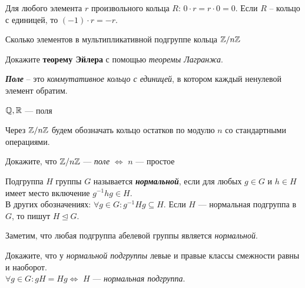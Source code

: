 \documentclass{article}
\begin{document}
    \begin{task_boxed}
        Для любого элемента $r$ произвольного кольца $R$: $0 \cdot r = r \cdot 0 = 0$.
        Если $R$ – кольцо с единицей, то $(-1) \cdot r = -r$.
    \end{task_boxed}

    \begin{task_boxed}
        Сколько элементов в мультипликативной подгруппе кольца $\mathbb{Z}/n\mathbb{Z}$
    \end{task_boxed}


    \begin{task_boxed}
        Докажите \textbf{теорему Эйлера} с помощью \textit{теоремы Лагранжа}.
    \end{task_boxed}


    \begin{definition_boxed}
        \textbf{\textit{Поле}} – это\textit{ коммутативное кольцо с единицей}, в котором каждый ненулевой элемент обратим.
    \end{definition_boxed}

    \begin{example}
        $ \mathbb{Q}, \mathbb{R} $ --- поля
    \end{example}


    \begin{example}
        Через $\mathbb{Z}/n\mathbb{Z}$ будем обозначать кольцо остатков по модулю $n$ со стандартными операциями.
    \end{example}

    \begin{task_boxed}
        Докажите, что $\mathbb{Z}/n\mathbb{Z}$ --- \textit{поле} $\Longleftrightarrow$ $n$ --- простое
    \end{task_boxed}

    \begin{definition_boxed}
        Подгруппа $H$ группы $G$ называется \textbf{\textit{нормальной}}, если для любых $g \in G$ и $h \in H$ имеет место включение $g^{-1}h g \in H$.\\
        В других обозначениях: $\forall g \in G : g^{-1}Hg \subseteq H$.
        Если $H$ — нормальная подгруппа в $G$, то пишут $H \trianglelefteq G$.
    \end{definition_boxed}

    \begin{example}
        Заметим, что любая подгруппа абелевой группы является \textit{нормальной}.
    \end{example}

    \begin{task_boxed}
        Докажите, что у \textit{нормальной подгруппы} левые и правые классы смежности равны и наоборот.\\
        $\forall g \in G: gH = Hg \Longleftrightarrow$ $H$ --- \textit{нормальная подгруппа}.
    \end{task_boxed}
\end{document}

